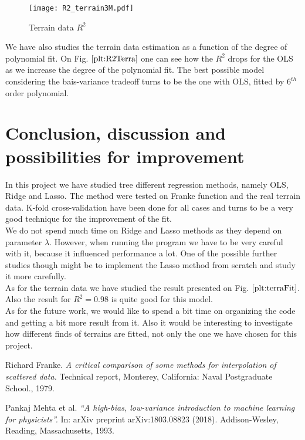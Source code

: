 \documentclass[10pt]{article}
\begin{document}
\begin{figure}
	\centerline{\texttt{[image: R2\_terrain3M.pdf]}}
	\caption{Terrain data $R^2$} \label{plt:R2Terra}
\end{figure}



We have also studies the terrain data estimation as a function of the degree of polynomial fit. On Fig. $\ref{plt:R2Terra}$ one can see how the $R^2$ drops for the OLS as we increase the degree of the polynomial fit.  The best possible model considering the bais-variance tradeoff turns to be the one with OLS, fitted by $6^{th}$ order polynomial.  



\newpage
\section{Conclusion, discussion and possibilities for improvement}\label{Conclusion}
In this project we have studied tree different regression methods, namely OLS, Ridge and Lasso. The method were tested on Franke function and the real terrain data. K-fold cross-validation have been done for all cases and turns to be a very good technique for the improvement of the fit. \\
We do not spend much time on Ridge and Lasso methods as they depend on parameter $\lambda$. However, when running the program we have to be very careful with it, because it influenced performance a lot. One of the possible further studies though might be to implement the Lasso method from scratch and study it more carefully.\\
As for the terrain data we have studied the result presented on Fig. $\ref{plt:terraFit}$. Also the result for $R^2= 0.98$ is quite good for this model.\\
As for the future work, we would like to spend a bit time on organizing the code and getting a bit more result from it. Also it would be interesting to investigate how different finds of terrains are fitted, not only the one we have chosen for this project.\\


\newpage
\begin{thebibliography}{9}
	Richard Franke. 
	\textit{A critical comparison of some methods for interpolation of scattered data. }
	Technical report, Monterey, California: Naval Postgraduate School., 1979.
	
	Pankaj Mehta et al. 
	\textit{ “A high-bias, low-variance introduction to machine learning for physicists”.}
	 In: arXiv preprint arXiv:1803.08823 (2018). Addison-Wesley, Reading, Massachusetts, 1993.


\end{thebibliography}
\end{document}
